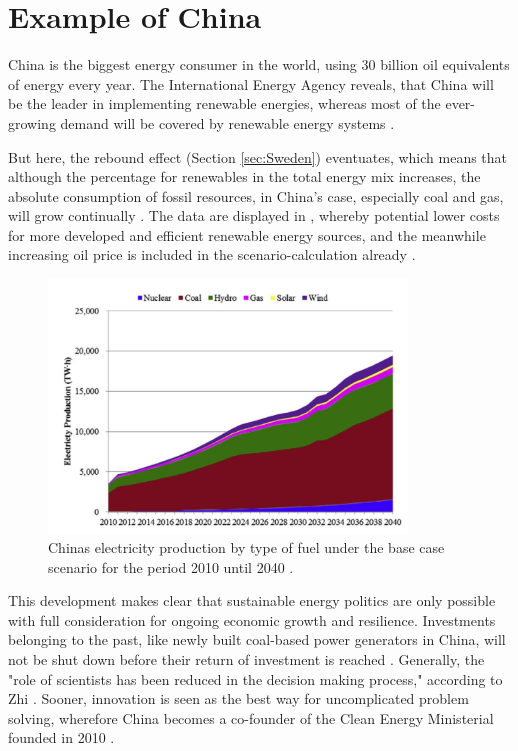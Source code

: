 \section{Example of China}
\label{sec:China}
China is the biggest energy consumer in the world, using 30 billion oil equivalents of energy every year\cite{IEA_China_demand}.
The International Energy Agency reveals, that China will be the leader in implementing renewable energies, 
whereas most of the ever-growing demand will be covered by renewable energy systems \cite{IEA_China_overview}.
\par
But here, the rebound effect (Section \ref{sec:Sweden}) eventuates, which means that although the percentage for renewables in the total energy mix increases,
the absolute consumption of fossil resources, in China's case, especially coal and gas, will grow continually \cite[1480]{China_economy} \cite[1482]{China_economy} \cite{Sweden}.
The data are displayed in , whereby potential lower costs for more developed and efficient renewable energy sources, and the meanwhile increasing oil price is included in the scenario-calculation already \cite[1482]{China_economy}.

\begin{figure}
  \centering
  \includegraphics[width=0.85\textwidth]{graphics/China_mix.jpg}
  \caption{Chinas electricity production by type of fuel under the base case scenario for the period 2010 until 2040 \cite{UN_Climate_Goals}.}
  \label{fig:china_mix}
\end{figure}

\par
This development makes clear that sustainable energy politics are only possible with full consideration for ongoing economic growth and resilience.
Investments belonging to the past, like newly built coal-based power generators in China, will not be shut down before their return of investment is reached \cite[1577]{ChinaEvol}.
Generally, the "role of scientists has been reduced in the decision making process," according to Zhi \cite[1]{ChinaEvol}.
Sooner, innovation is seen as the best way for uncomplicated problem solving, 
wherefore China becomes a co-founder of the Clean Energy Ministerial founded in 2010 \cite{IEA_China_comment}. 

